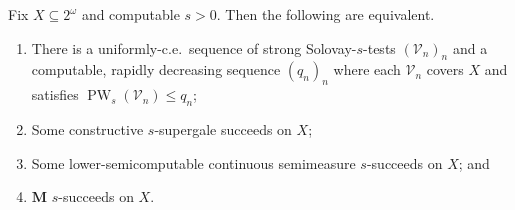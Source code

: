 \begin{theorem}
    \label{theorem:continuous_semimeasure_is_supergale_is_strong_Solovay_tests}
    Fix $X \subseteq 2^\omega$ and computable $s > 0$. Then the following are equivalent.
    \begin{enumerate}[label = (\roman*)]
        \item There is a uniformly-c.e.~sequence of strong Solovay-$s$-tests $(\mathcal{V}_n)_n$ and a computable, rapidly decreasing sequence $(q_n)_n$ where each $\mathcal{V}_n$ covers $X$ and satisfies $\operatorname{PW}_s(\mathcal{V}_n) \leq q_n$; 
        \item Some constructive $s$-supergale succeeds on $X$;
        \item Some lower-semicomputable continuous semimeasure $s$-succeeds on $X$; and
        \item $\mathbf{M}$ $s$-succeeds on $X$.
    \end{enumerate}
\end{theorem}
